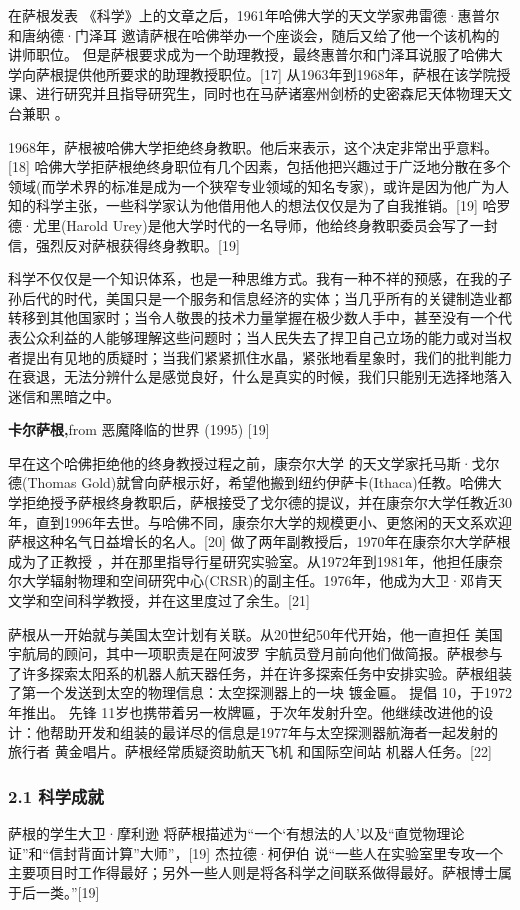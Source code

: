 在萨根发表 《科学》上的文章之后，1961年哈佛大学的天文学家弗雷德·惠普尔和唐纳德·门泽耳 邀请萨根在哈佛举办一个座谈会，随后又给了他一个该机构的讲师职位。 但是萨根要求成为一个助理教授，最终惠普尔和门泽耳说服了哈佛大学向萨根提供他所要求的助理教授职位。[17] 从1963年到1968年，萨根在该学院授课、进行研究并且指导研究生，同时也在马萨诸塞州剑桥的史密森尼天体物理天文台兼职 。

1968年，萨根被哈佛大学拒绝终身教职。他后来表示，这个决定非常出乎意料。[18] 哈佛大学拒萨根绝终身职位有几个因素，包括他把兴趣过于广泛地分散在多个领域(而学术界的标准是成为一个狭窄专业领域的知名专家)，或许是因为他广为人知的科学主张，一些科学家认为他借用他人的想法仅仅是为了自我推销。[19] 哈罗德·尤里(Harold Urey)是他大学时代的一名导师，他给终身教职委员会写了一封信，强烈反对萨根获得终身教职。[19]

科学不仅仅是一个知识体系，也是一种思维方式。我有一种不祥的预感，在我的子孙后代的时代，美国只是一个服务和信息经济的实体；当几乎所有的关键制造业都转移到其他国家时；当令人敬畏的技术力量掌握在极少数人手中，甚至没有一个代表公众利益的人能够理解这些问题时；当人民失去了捍卫自己立场的能力或对当权者提出有见地的质疑时；当我们紧紧抓住水晶，紧张地看星象时，我们的批判能力在衰退，无法分辨什么是感觉良好，什么是真实的时候，我们只能别无选择地落入迷信和黑暗之中。

\textbf{卡尔萨根,}from 恶魔降临的世界 (1995) [19]

早在这个哈佛拒绝他的终身教授过程之前，康奈尔大学 的天文学家托马斯·戈尔德(Thomas Gold)就曾向萨根示好，希望他搬到纽约伊萨卡(Ithaca)任教。哈佛大学拒绝授予萨根终身教职后，萨根接受了戈尔德的提议，并在康奈尔大学任教近30年，直到1996年去世。与哈佛不同，康奈尔大学的规模更小、更悠闲的天文系欢迎萨根这种名气日益增长的名人。[20] 做了两年副教授后，1970年在康奈尔大学萨根成为了正教授 ，并在那里指导行星研究实验室。从1972年到1981年，他担任康奈尔大学辐射物理和空间研究中心(CRSR)的副主任。1976年，他成为大卫·邓肯天文学和空间科学教授，并在这里度过了余生。[21]

萨根从一开始就与美国太空计划有关联。从20世纪50年代开始，他一直担任 美国宇航局的顾问，其中一项职责是在阿波罗 宇航员登月前向他们做简报。萨根参与了许多探索太阳系的机器人航天器任务，并在许多探索任务中安排实验。萨根组装了第一个发送到太空的物理信息：太空探测器上的一块 镀金匾。 提倡 10，于1972年推出。 先锋 11岁也携带着另一枚牌匾，于次年发射升空。他继续改进他的设计：他帮助开发和组装的最详尽的信息是1977年与太空探测器航海者一起发射的 旅行者 黄金唱片。萨根经常质疑资助航天飞机 和国际空间站 机器人任务。[22]
\subsubsection{2.1 科学成就}
萨根的学生大卫·摩利逊 将萨根描述为“一个‘有想法的人’以及“直觉物理论证”和“信封背面计算”大师”，[19] 杰拉德·柯伊伯 说“一些人在实验室里专攻一个主要项目时工作得最好；另外一些人则是将各科学之间联系做得最好。萨根博士属于后一类。”[19]

